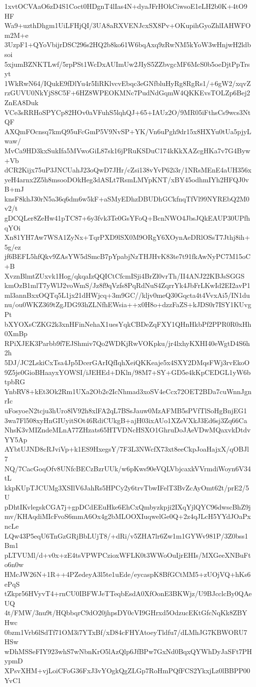 1xvtOCVAaO6zD4S1Coct0HDgnT4lIas4N+dyaJFrHOkCiwsoE1eLH2b0K+4tO9HF
Wa9+uzthDhgm1UiLFHjQI/3UA8aRXVENJcxSX8Pv+OKupihGyoZhlIAHWFOm2M+e
3UzpF1+QYoVbijrDSC296s2HQ2b8ko61W6bqAxq9zRwNM5kYoW3wHnjwH2ldbsoi
5xjumBZNKTLwf/5rpPSt1WcDxAUImUw2JIyS5ZZbvgcMF6McS0b5oeDjtPpTrsyt
1WkRwN64/IQukE9fDlYu4r5IiRKlvcvEbqc3eGNfbluHyRg8RgRs1/+6gW2/xqvZ
rzGUVU0NkYjS8C5F+6HZ8WPEOKMNc7PudNdGqmW4QKKEvsTOLZp6Bej2ZnEA8Duk
VCe3sRRHoSPYCp82HOv0aVFuhS5lqhQJ+65+IAUz2O/9MR05iFthsCs9wcs3NtQF
AXQmFOcnsq7kmQ95uFcGmP5V9NvSP+YK/Vn6uPgh9dr15x8HXYu0tUa5pjyLwaw/
MvCa9HD3kxSukIfa5MVwoGiL87sk16jPRuKSDuC174kKkXAZcgHKa7v7G4Byw+Vb
dCR2Kijx75uP3JNCUahJ23oQwD7JHr/cZsi138vYvP62i3r/1NRsMEnE4aUH356x
yeH4arnx2Z5h8msooDOkHeg3dASLt7RsmLMYpKNT/xBY45odhmIYh2HFQJ0vB+mJ
knsF8khJ30rN5a36q6dm6w5kF+aSMyEDhzDBUDhGCkfnqTfVl99NYREbQ2M0v2/t
gDCQLer8ZeHw41pTC87+6y3fvk3Te0GsYFoQ+BcnNWO4JbsJQkEAUP30UPfhqYOi
Xn81YH7Aw7WSA1ZyNx+TqrPXD9lSX0M9ORgY6XOynAeDRlOSsT7Jthj8ih+5g/ez
jf6BEFL5hfQkv9ZAsYW5dSmcB7pYpabjNzTHJHvK83te7t91fkAwNyPC7M15oC+B
XvznBlmtZUxvk1Hog/qkqaIzQQICtCfcmISji4BrZl0vrTh/II4ANJ22KBJsSGGS
kmOzB1mlT7yWlJ2voWmS/Jz8f9qVzfs8PqRdNuS4ZqrrYk4JbFrLKwId2EI2avP1
ml3annBxxOQTq5L1jx21dHWjcq+3m9GC//kljv0meQ30Gqcta4t4VvxAi5/IN1du
nu/ou0WKZ369tZgJDG93hZLNfhEWsia++x0H8o+dzzFaZS+kJDS0r7ISY1KUvgPt
bXYOXsCZKG2k3xnHFinNehaX1uesYqkCBDeZqFXY1QHnHkbPf2PPR0R0xHh0XmBp
RPiXJEK3Parbb9f7EJShmiv7Qo2WDKjRwVOKpku/jr4lxhyKXHI40eWgtD4S6h2h
5DJ/JC2LskiCxTsa4Jp5DcerGArIQfIqhXeiQKKeaje5x4SXY2DMqsFWj3rvEkoO
9Z5je0GioBHaayxYOWSI/iJEHEd+DKln/98M7+SY+GD5e4kKpCEDGL1yW6btpbRG
YnbRV8+kEt3Ok2Rm1UXa2Ob2e2IcNhmad3xoSV4eCcx72OET2BDa7cuWnnJgnrIc
uFosyoeN2tcju3hUro8lV92h8xlFA2qL7BSsJauw0MzAFMB5sPVfTlSoHgBnjEG1
3wa7Fl508xyHnGIUyitSOt46RdiCUkgB+ajH03ixAUo1XZeVXkJ3Ed6sj3Zq66Ca
NhsK3vMIZndeMLnA77ZHzats65HTVDNcHSXO1GhruDoJAeVDwMQaxvkDtdvYY5Ap
AYbtUJND8cRJviVp+k1ES9HxegsY/7F3L3NWcfX73xt8eeCkpJoaHajxX/qOBJl7
NQ/7CacGoqOfv8UNfcBECzBzrUUk/w6pKws90eVQLVbjcaxkVVrmdiWoyn6V34tL
kkpKUpTJCUMg3XSIlV6JahRs5HPCy2y6trvTbwIFelT3BvZcAyOmt62t/prE2/5U
pDhtIKvlegskCGA7j+gpDCdEEuHke6EhCxQmbyzkpji2IXqYjlQYC96dwscBhZ9j
mv/KHAqdiMIcFvoS6mmA6Ox4g2bMLOOXIuqwelGe0Q+2z4qJLcH5YYdJOaPxncLe
LQw43P5eqU6TnGzGRjBbLUjT8/+dRi/v5ZHA7lr6Zw1m1GYWv981P/3Z0bss1Bm1
pLTVUMl/d+v0x+zE4tsVPWPCzioxWFLK0t3WWoOuIjrEHIs/MXGeeXNBuFto6n0w
HMcJW26N+1R++4PZedeyA3l5te1uEde/eycaspK8BfGCtMM5+zUOjVQ+hKs6ePqS
tZkpr56HVyvT4+rnCU0IBFWJeTTeqbEsdA0XfOonE3BKWjz/U9BJcclcBy0QAeUQ
4t/FMW/3nu9t/HQbbqrC9dO20jhpsDY0cVI9GHrxd5OdzucEKtGfcNqKk8ZBYHwc
0bzm1Vrb6lSdTf71OM3i7YTxBf/xD84cFHYAtoeyTldfu7/dLMhJG7KBWORU7HSw
wDhMSSeFIY923whS7wNbnKrO5lAzQlp6JfBPw7GxNd0BqxQYWhDyJaSFt7PHypmD
XPsvXHM+vjLoiCFoG36FxJ3vYOgkQgZLGp7RoHmPQfFCS2YkxjLz0lBBPP00YvC1
